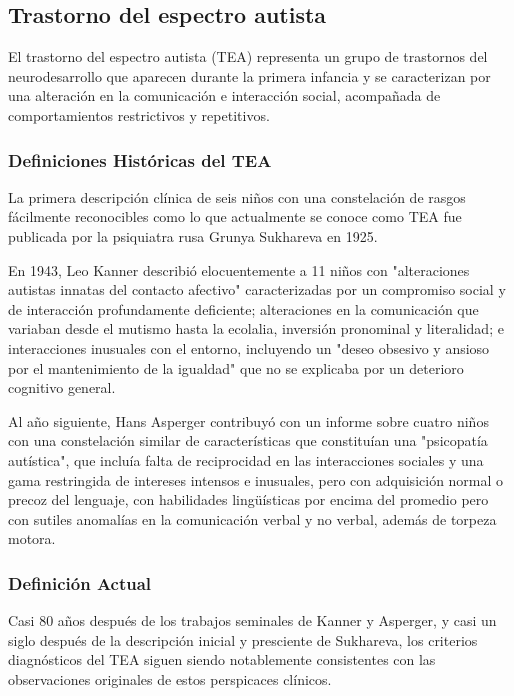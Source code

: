 \documentclass[11pt,letterpaper]{report}
\begin{document}
\subsection{Trastorno del espectro autista}
El trastorno del espectro autista (TEA) representa un grupo de trastornos del
neurodesarrollo que aparecen durante la primera infancia y se caracterizan por
una alteración en la comunicación e interacción social, acompañada de
comportamientos restrictivos y repetitivos.

\subsubsection{Definiciones Históricas del TEA}
La primera descripción clínica de seis niños con una constelación de rasgos
fácilmente reconocibles como lo que actualmente se conoce como TEA fue
publicada por la psiquiatra rusa Grunya Sukhareva en 1925. \cite{Myers2025}

En 1943, Leo Kanner describió elocuentemente a 11 niños con "alteraciones
autistas innatas del contacto afectivo" caracterizadas por un compromiso social
y de interacción profundamente deficiente; alteraciones en la comunicación que
variaban desde el mutismo hasta la ecolalia, inversión pronominal y literalidad;
e interacciones inusuales con el entorno, incluyendo un "deseo obsesivo y
ansioso por el mantenimiento de la igualdad" que no se explicaba por un
deterioro cognitivo general. \cite{Myers2025}

Al año siguiente, Hans Asperger contribuyó con un informe sobre cuatro niños
con una constelación similar de características que constituían una
"psicopatía autística", que incluía falta de reciprocidad en las
interacciones sociales y una gama restringida de intereses intensos e
inusuales, pero con adquisición normal o precoz del lenguaje, con habilidades
lingüísticas por encima del promedio pero con sutiles anomalías en la
comunicación verbal y no verbal, además de torpeza motora. \cite{Myers2025}

\subsubsection{Definición Actual}
Casi 80 años después de los trabajos seminales de Kanner y Asperger, y casi un
siglo después de la descripción inicial y presciente de Sukhareva, los
criterios diagnósticos del TEA siguen siendo notablemente consistentes con las
observaciones originales de estos perspicaces clínicos. \cite{Myers2025}
\end{document}
